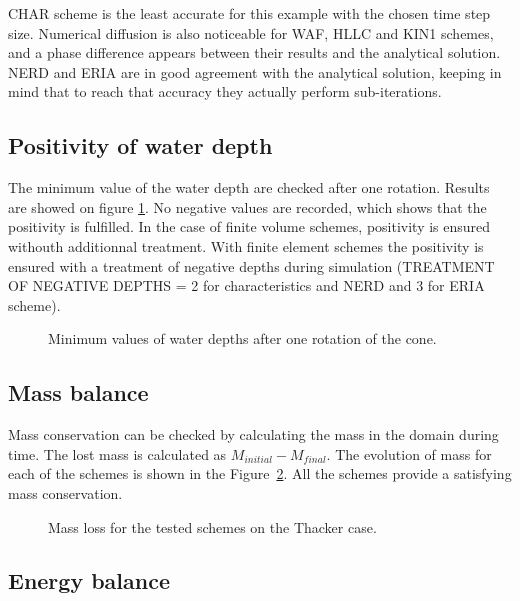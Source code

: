 CHAR scheme is the least accurate for this example with the chosen time step size.
Numerical diffusion is also noticeable for WAF, HLLC and KIN1 schemes, and a phase difference appears between their results and the analytical solution.
NERD and ERIA are in good agreement with the analytical solution, keeping in mind that to reach that accuracy they actually perform sub-iterations.

\subsection{Positivity of water depth}

The minimum value of the water depth are checked after one rotation. 
Results are showed on figure \ref{t2d:thacker:minmax}. 
No negative values are recorded, which shows that the positivity is fulfilled.
In the case of finite volume schemes, positivity is ensured withouth additionnal treatment.
With finite element schemes the positivity is ensured with a treatment of negative depths
during simulation (TREATMENT OF NEGATIVE DEPTHS = 2 for characteristics and NERD and 3 for ERIA scheme).

\begin{figure}[H]
\centering
{}
\caption{Minimum values of water depths after one rotation of the cone.}
\label{t2d:thacker:minmax}
\end{figure}

\subsection{Mass balance}

Mass conservation can be checked by calculating the mass in the domain during time.
The lost mass is calculated as $M_{initial} - M_{final}$.
The evolution of mass for each of the schemes is shown in the Figure~\ref{fig:thacker:VoLTime}.
All the schemes provide a satisfying mass conservation.

\begin{figure}[H]
\centering
  \caption{Mass loss for the tested schemes on the Thacker case.}
\label{fig:thacker:VoLTime}
\end{figure}

\subsection{Energy balance}


